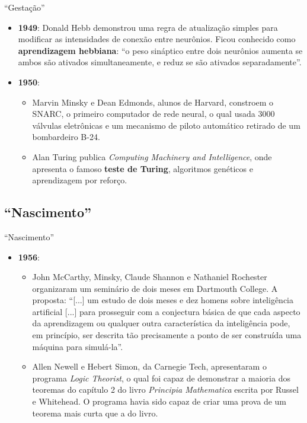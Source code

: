 \documentclass{libs/ufc_format}
\begin{document}
\begin{frame}{``Gestação''}
    \begin{itemize}
        \justifying
        \item<1> \textbf{1949}: Donald Hebb demonstrou uma regra de atualização simples para modificar as intensidades de conexão entre neurônios. Ficou conhecido como \textbf{aprendizagem hebbiana}: ``o peso sináptico entre dois neurônios aumenta se ambos são ativados simultaneamente, e reduz se são ativados separadamente''.
        \item<2-> \textbf{1950}: 
            \begin{itemize}
                \justifying
                \item<2> Marvin Minsky e Dean Edmonds, alunos de Harvard, constroem o SNARC, o primeiro computador de rede neural, o qual usada 3000 válvulas eletrônicas e um mecanismo de piloto automático retirado de um bombardeiro B-24.
                \item<3> Alan Turing publica \textit{Computing Machinery and Intelligence}, onde apresenta o famoso \textbf{teste de Turing}, algoritmos genéticos e aprendizagem por reforço.
            \end{itemize}
    \end{itemize}
\end{frame}

\subsection{``Nascimento''}

\begin{frame}{``Nascimento''}
    \begin{itemize}
        \justifying
        \item \textbf{1956}: 
            \begin{itemize}
                \justifying
                \item<1> John McCarthy, Minsky, Claude Shannon e Nathaniel Rochester organizaram um seminário de dois meses em Dartmouth College. A proposta: ``[...] um estudo de dois meses e dez homens sobre inteligência artificial [...] para prosseguir com a conjectura básica de que cada aspecto da aprendizagem ou qualquer outra característica da inteligência pode, em princípio, ser descrita tão precisamente a ponto de ser construída uma máquina para simulá-la''.
                \item<2> Allen Newell e Hebert Simon, da Carnegie Tech, apresentaram o programa \textit{Logic Theorist}, o qual foi capaz de demonstrar a maioria dos teoremas do capítulo 2 do livro \textit{Principia Mathematica} escrita por Russel e Whitehead. O programa havia sido capaz de criar uma prova de um teorema mais curta que a do livro.
            \end{itemize}
    \end{itemize}
\end{frame}
\end{document}
